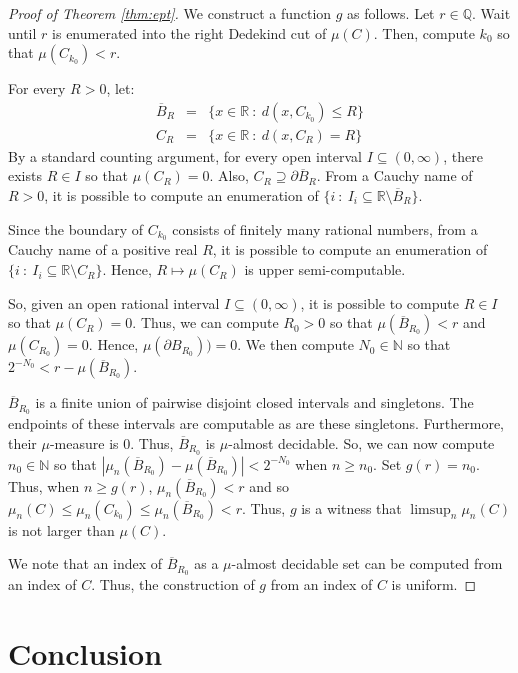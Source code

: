 \documentclass{amsart}
\newcommand{\Q}{\mathbb{Q}}
\newcommand{\R}{\mathbb{R}}
\newcommand{\N}{\mathbb{N}}
\newcommand{\ol}{\overline}
\theoremstyle{definition}
\numberwithin{equation}{section}
\begin{document}
\begin{proof}[Proof of Theorem \ref{thm:ept}]
We construct a function $g$ as follows.  Let $r \in \Q$.  Wait until $r$ is enumerated into the right Dedekind cut of $\mu(C)$.  Then, compute $k_0$ so that $\mu(C_{k_0}) < r$.  

For every $R > 0$, let:
\begin{eqnarray*}
\ol{B}_R & = & \{x \in \R\ :\ d(x, C_{k_0}) \leq R\}\\
C_R & =& \{x \in \R\ :\ d(x, C_R) = R\}
\end{eqnarray*}
By a standard counting argument, for every open interval $I \subseteq (0, \infty)$, there exists $R \in I$ so that 
$\mu(C_R) = 0$.  Also, $C_R \supseteq \partial \ol{B}_R$.  From a Cauchy name of $R > 0$, it is possible to compute an enumeration of $\{i\ :\ I_i \subseteq \R\setminus\ol{B}_R\}$.  

Since the boundary of $C_{k_0}$ consists of finitely many rational numbers, from a Cauchy name of a positive real $R$, it is possible to compute an enumeration of 
$\{i\ :\ I_i \subseteq \R\setminus C_R\}$.  Hence, $R \mapsto \mu(C_R)$ is upper semi-computable.

So, given an open rational interval $I \subseteq (0, \infty)$, it is possible to compute $R \in I$ so that $\mu(C_R) = 0$.  
Thus, we can compute $R_0 >0$ so that $\mu(\ol{B}_{R_0}) < r$ and $\mu(C_{R_0}) = 0$.  Hence, $\mu(\partial B_{R_0})) = 0$.  We then compute $N_0 \in \N$ so that $2^{-N_0} < r - \mu(\ol{B}_{R_0})$.  

$\ol{B}_{R_0}$ is a finite union of pairwise disjoint closed intervals and singletons.  The endpoints of these intervals are computable as are these singletons.  Furthermore, their $\mu$-measure is $0$.  Thus, $\ol{B}_{R_0}$ is $\mu$-almost decidable.  
So, we can now compute $n_0 \in \N$ so that $|\mu_n(\ol{B}_{R_0}) - \mu(\ol{B}_{R_0})| < 2^{-N_0}$ when $n \geq n_0$.  Set $g(r) = n_0$.  Thus, when $n \geq g(r)$, $\mu_n(\ol{B}_{R_0}) < r$ and so $\mu_n(C) \leq \mu_n(C_{k_0}) \leq \mu_n(\ol{B}_{R_0}) < r$.  Thus, $g$ is a witness that $\limsup_n \mu_n(C)$ is not larger than $\mu(C)$.

We note that an index of $\ol{B}_{R_0}$ as a $\mu$-almost decidable set can be computed from an index of $C$.  Thus, the construction of $g$ from an index of $C$ is uniform.
\end{proof}

\section{Conclusion}
\end{document}
